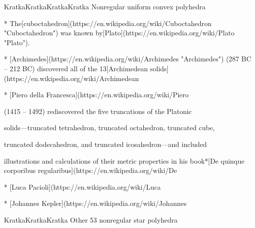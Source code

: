KratkaKratkaKratkaKratka Nonregular uniform convex polyhedra

* The[cuboctahedron](https://en.wikipedia.org/wiki/Cuboctahedron "Cuboctahedron") was known by[Plato](https://en.wikipedia.org/wiki/Plato "Plato").

* [Archimedes](https://en.wikipedia.org/wiki/Archimedes "Archimedes") (287 BC – 212 BC) discovered all of the 13[Archimedean solids](https://en.wikipedia.org/wiki/Archimedean%

* [Piero della Francesca](https://en.wikipedia.org/wiki/Piero%

(1415 – 1492) rediscovered the five truncations of the Platonic

solids—truncated tetrahedron, truncated octahedron, truncated cube,

truncated dodecahedron, and truncated icosahedron—and included

illustrations and calculations of their metric properties in his book*[De quinque corporibus regularibus](https://en.wikipedia.org/wiki/De%

* [Luca Pacioli](https://en.wikipedia.org/wiki/Luca%

* [Johannes Kepler](https://en.wikipedia.org/wiki/Johannes%

KratkaKratkaKratka Other 53 nonregular star polyhedra

